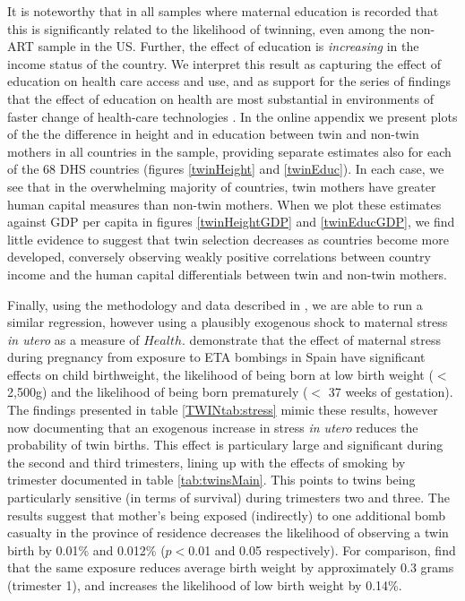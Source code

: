 \documentclass[subeqn]{article}
\begin{document}
\begin{spacing}{1.4}
It is noteworthy that in all samples where maternal education is recorded that
this is significantly related to the likelihood of twinning, even among the
non-ART sample in the US.  Further, the effect of education is \emph{increasing}
in the income status of the country.  We interpret this result as capturing the
effect of education on health care access and use, and as support for the series
of findings that the effect of education on health are most substantial in
environments of faster change of health-care technologies \citep{LlerasMuney2005,
  CutlerLlerasMuney2010}.  In the online appendix we present plots of the the
difference in height and in education between twin and non-twin mothers in all
countries in the sample, providing separate estimates also for each of the 68
DHS countries (figures \ref{twinHeight} and \ref{twinEduc}).  In each case, we
see that in the overwhelming majority of countries, twin mothers have greater
human capital measures than non-twin mothers.  When we plot these estimates
against GDP per capita in figures \ref{twinHeightGDP} and \ref{twinEducGDP}, we
find little evidence to suggest that twin selection decreases as countries become
more developed, conversely observing weakly positive correlations between country
income and the human capital differentials between twin and non-twin mothers.

Finally, using the methodology and data described in \citet{QuintanaRodenas2014},
we are able to run a similar regression, however using a plausibly exogenous
shock to maternal stress \emph{in utero} as a measure of $Health$.
\citet{QuintanaRodenas2014} demonstrate that the effect of maternal stress during
pregnancy from exposure to ETA bombings in Spain have significant effects on
child birthweight, the likelihood of being born at low birth weight ($<$ 2,500g)
and the likelihood of being born prematurely ($<$ 37 weeks of gestation).  The
findings presented in table \ref{TWINtab:stress} mimic these results, however
now documenting that an exogenous increase in stress \emph{in utero} reduces the
probability of twin births. This effect is particulary large and significant
during the second and third trimesters, lining up with the effects of smoking by
trimester documented in table \ref{tab:twinsMain}.  This points to twins being
particularly sensitive (in terms of survival) during trimesters two and three.
The results suggest that mother's being exposed (indirectly) to one additional
bomb casualty in the province of residence decreases the likelihood of observing
a twin birth by 0.01\% and 0.012\% ($p<$0.01 and 0.05 respectively). For
comparison, \citet{QuintanaRodenas2014} find that the same exposure reduces
average birth weight by approximately 0.3 grams (trimester 1), and increases
the likelihood of low birth weight by 0.14\%.


\end{spacing}
\end{document}
